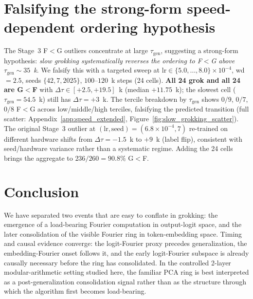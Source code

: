 \documentclass{article}
\newcommand{\taug}{\tau_{\mathrm{gen}}}
\newcommand{\Dtau}{\Delta\tau}
\begin{document}
\section{Falsifying the strong-form speed-dependent ordering hypothesis}
\label{sec:speed}

The Stage~3 F$<$G outliers concentrate at large $\taug$, suggesting
a strong-form hypothesis: \emph{slow grokking systematically reverses
the ordering to F$<$G above $\taug \sim 35$~k}. We falsify this with a
targeted sweep at $\mathrm{lr}\in\{5.0,\dots,8.0\}\!\times\!10^{-4}$,
wd$=2.5$, seeds $\{42,7,2025\}$, $100$--$120$~k steps (24 cells).
\textbf{All 24 grok and all 24 are G$<$F} with $\Dtau\in[+2.5,+19.5]$~k
(median $+11.75$~k); the slowest cell ($\taug=54.5$~k) still has
$\Dtau=+3$~k. The tercile breakdown by $\taug$ shows $0/9$, $0/7$,
$0/8$ F$<$G across low/middle/high terciles, falsifying the
predicted transition (full scatter:
Appendix~\ref{app:speed_extended}, Figure~\ref{fig:slow_grokking_scatter}).
The original Stage~3 outlier at
$(\mathrm{lr},\mathrm{seed}){=}(6.8\!\times\!10^{-4}, 7)$
re-trained on different hardware shifts from $\Dtau=-1.5$~k to
$+9$~k (label flip), consistent with seed/hardware variance rather
than a systematic regime. Adding the 24 cells brings the aggregate
to $236/260{=}90.8\%$ G$<$F.

\section{Conclusion}
\label{sec:conclusion}

We have separated two events that are easy to conflate in grokking:
the emergence of a load-bearing Fourier computation in output-logit
space, and the later consolidation of the visible Fourier ring in
token-embedding space. Timing and causal evidence converge: the
logit-Fourier proxy precedes generalization, the embedding-Fourier
onset follows it, and the early logit-Fourier subspace is already
causally necessary before the ring has consolidated. In the
controlled 2-layer modular-arithmetic setting studied here, the
familiar PCA ring is best interpreted as a post-generalization
consolidation signal rather than as the structure through which the
algorithm first becomes load-bearing.

\end{document}
